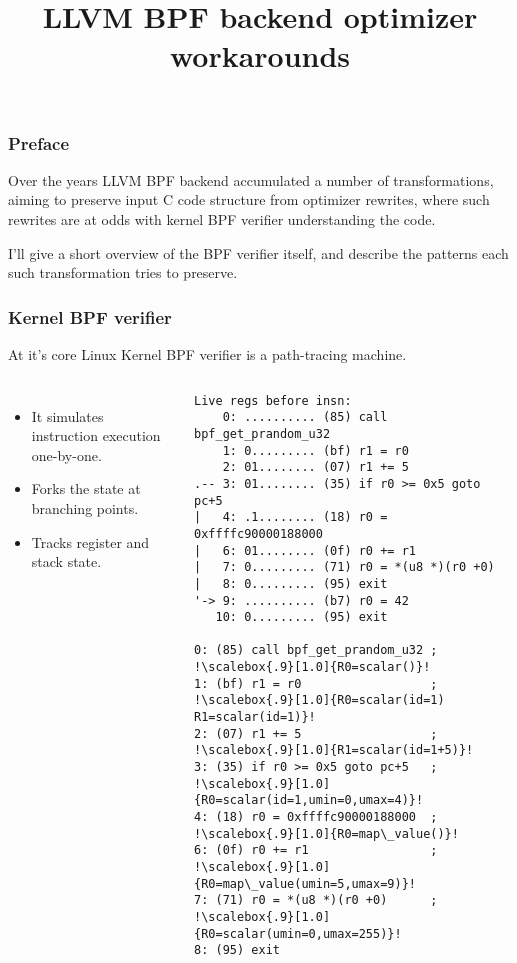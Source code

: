 \documentclass{beamer}
\title{LLVM BPF backend optimizer workarounds}
\date{}
\begin{document}
\frame{\titlepage}

\begin{frame}[fragile]
\frametitle{Preface}

Over the years LLVM BPF backend accumulated a number of
transformations, aiming to preserve input C code structure from
optimizer rewrites, where such rewrites are at odds with kernel BPF
verifier understanding the code.

I'll give a short overview of the BPF verifier itself, and describe
the patterns each such transformation tries to preserve.

\end{frame}

\begin{frame}
  \frametitle{Kernel BPF verifier}

  At it's core Linux Kernel BPF verifier is a path-tracing machine.
  \begin{columns}[t]
    \scriptsize
    \begin{itemize}
    \item It simulates instruction execution one-by-one.
    \item Forks the state at branching points.
    \item Tracks register and stack state.
    \end{itemize}
    \begin{verbatim}
Live regs before insn:
    0: .......... (85) call bpf_get_prandom_u32
    1: 0......... (bf) r1 = r0
    2: 01........ (07) r1 += 5
.-- 3: 01........ (35) if r0 >= 0x5 goto pc+5
|   4: .1........ (18) r0 = 0xffffc90000188000
|   6: 01........ (0f) r0 += r1
|   7: 0......... (71) r0 = *(u8 *)(r0 +0)
|   8: 0......... (95) exit
'-> 9: .......... (b7) r0 = 42
   10: 0......... (95) exit

0: (85) call bpf_get_prandom_u32 ; !\scalebox{.9}[1.0]{R0=scalar()}!
1: (bf) r1 = r0                  ; !\scalebox{.9}[1.0]{R0=scalar(id=1) R1=scalar(id=1)}!
2: (07) r1 += 5                  ; !\scalebox{.9}[1.0]{R1=scalar(id=1+5)}!
3: (35) if r0 >= 0x5 goto pc+5   ; !\scalebox{.9}[1.0]{R0=scalar(id=1,umin=0,umax=4)}!
4: (18) r0 = 0xffffc90000188000  ; !\scalebox{.9}[1.0]{R0=map\_value()}!
6: (0f) r0 += r1                 ; !\scalebox{.9}[1.0]{R0=map\_value(umin=5,umax=9)}!
7: (71) r0 = *(u8 *)(r0 +0)      ; !\scalebox{.9}[1.0]{R0=scalar(umin=0,umax=255)}!
8: (95) exit


\end{verbatim}
\end{columns}
\end{frame}
\end{document}
